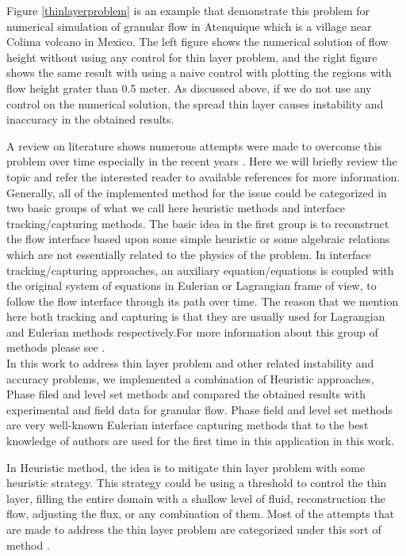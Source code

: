 \documentclass[letterpaper,10pt]{article}
\begin{document}
Figure \ref{thinlayerproblem} is an example that demonstrate this problem for numerical simulation of granular flow in  Atenquique which is a village near Colima volcano in Mexico. The left figure shows the numerical solution of flow height without using any control for thin layer problem, and the right figure shows the same result with using a naive control with plotting the regions with flow height grater than 0.5 meter. As discussed above, if we do not use any control on the numerical solution, the spread thin layer causes instability and inaccuracy in the obtained results.

A review on literature shows numerous attempts were made to overcome this problem over time especially in the recent years \cite{Medeiros2013,Balzano1998,Aureli2008,Bunya2009,Casulli2009a,
Kesserwani2011,DAlpaos2007,Castro2005a}.
Here we will briefly review the topic and refer the interested reader to available references for more information. \newline
Generally, all of the implemented method for the issue could be 
categorized in two basic groups of what we call here heuristic methods and interface tracking/capturing methods.
The basic idea in the first group is to reconstruct the flow interface based upon 
some simple heuristic or some algebraic relations which are not essentially related
to the physics of the problem. In interface tracking/capturing approaches, an auxiliary equation/equations is coupled with the original system of equations in Eulerian or Lagrangian frame of view, to follow the flow interface through its path over time. 
The reason that we mention here both tracking and capturing is that they are usually used for Lagrangian and Eulerian methods respectively.For more information about this group of methods please see \cite{Glimm1995,Unverdi1992,Osher1988,Anderson1998,hirt1981vfv}.\\
In this work to address thin layer problem and other related instability and accuracy problems, we implemented a combination of Heuristic approaches, Phase filed and level set methods and compared the obtained results with experimental and field data for granular flow. Phase field and level set methods are very well-known Eulerian interface capturing methods that to the best knowledge of authors are used for the first time in this application in this work. \newline

In Heuristic method, the idea is to mitigate thin layer problem with some heuristic strategy. This strategy could be using a threshold to control the thin layer, filling the entire domain with a shallow level of fluid, reconstruction the flow, adjusting the flux, or any combination of them. Most of the attempts that are made to address the thin layer problem are categorized under this sort of method \cite{Aureli2008,Bunya2009,Castro2005a,Kesserwani2011}.
\end{document}
